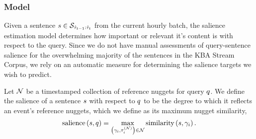 \subsubsection{Model}

Given a sentence $s \in \mathcal{S}_{\hat{\tau}_{{t-1}}:\hat{\tau}_t}$ from the
current hourly batch, the salience estimation model determines how important or
relevant it's content is with respect to the query. Since we do not have manual
assessments of query-sentence salience for the overwhelming majority of the
sentences in the KBA Stream Corpus, we rely on an automatic measure for
determining the salience targets we wish to predict.

Let $\mathcal{N}$ be a timestamped collection of reference nuggets for query
$q$. We define the salience of a sentence $s$ with respect to
$q$ to be the degree to which it reflects an event's reference nuggets,
which we define as its maximum nugget similarity,
\begin{align}
\operatorname{salience}\left(s, q\right) = \max_{\left(\gamma_{i},\tau^{(\mathcal{N})}_{i}\right) \in \mathcal{N}} 
\operatorname{similarity}\left(s, \gamma_i\right). \label{eq:salience}
\end{align}

